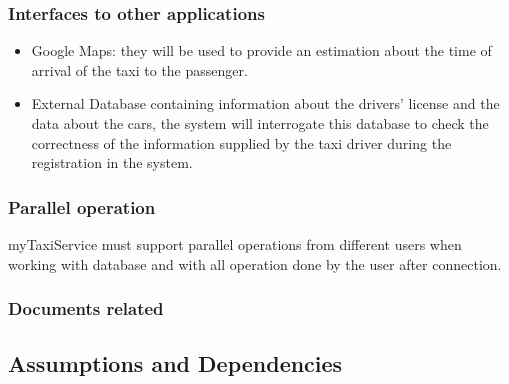 \documentclass[a4paper,12pt]{article}%
\begin{document}
\subsubsection{Interfaces to other applications}
\begin{itemize}
\item Google Maps: they will be used to provide an estimation about the time of arrival of the taxi to the passenger.
\item External Database containing information about the drivers' license and the data about the cars, the system will interrogate this database to check the correctness of the information supplied by the taxi driver during the registration in the system.
\end{itemize} 
\subsubsection{Parallel operation}
myTaxiService must support parallel operations from different users when working
with database and with all operation done by the user after connection.
\subsubsection{Documents related}
\subsection{Assumptions and Dependencies}
\end{document}
